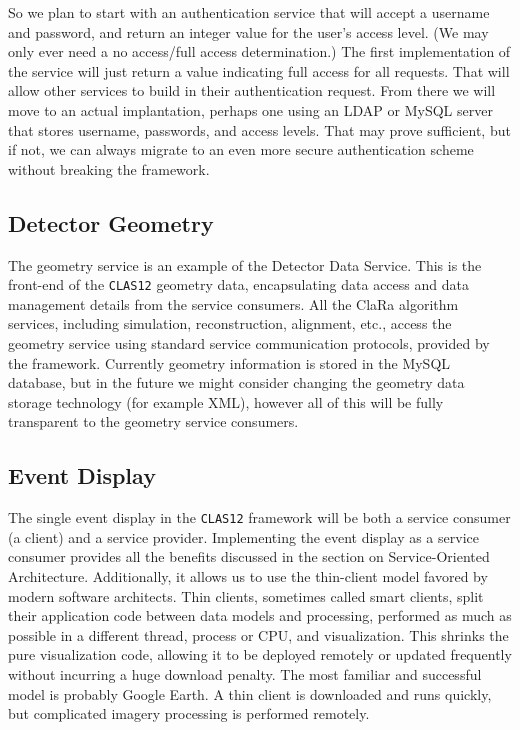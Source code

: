 So we plan to start with an authentication service that will accept a 
username and password, and return an integer value for the user's access 
level. (We may only ever need a no access/full access determination.) The 
first implementation of the service will just return a value indicating 
full access for all requests. That will allow other services to build in 
their authentication request. From there we will move to an actual 
implantation, perhaps one using an LDAP or MySQL server that stores username, 
passwords, and access levels. That may prove sufficient, but if not, we can 
always migrate to an even more secure authentication scheme without breaking 
the framework.

\subsection{Detector Geometry}

The geometry service is an example of the Detector Data Service. This is 
the front-end of the {\tt CLAS12} geometry data, encapsulating data access 
and data management details from the service consumers. All the ClaRa 
algorithm services, including simulation, reconstruction, alignment, etc., 
access the geometry service using standard service communication protocols, 
provided by the framework. Currently geometry information is stored in the 
MySQL database, but in the future we might consider changing the geometry 
data storage technology (for example XML), however all of this will be
fully transparent to the geometry service consumers.

\subsection{Event Display}

The single event display in the {\tt CLAS12} framework will be both a 
service consumer (a client) and a service provider.  Implementing the 
event display as a service consumer provides all the benefits discussed in 
the section on Service-Oriented Architecture. Additionally, it allows us to 
use the thin-client model favored by modern software architects. Thin 
clients, sometimes called smart clients, split their application code 
between data models and processing, performed as much as possible in a 
different thread, process or CPU, and visualization. This shrinks the pure 
visualization code, allowing it to be deployed remotely or updated frequently 
without incurring a huge download penalty. The most familiar and successful 
model is probably Google Earth. A thin client is downloaded and runs quickly, 
but complicated imagery processing is performed remotely. 

